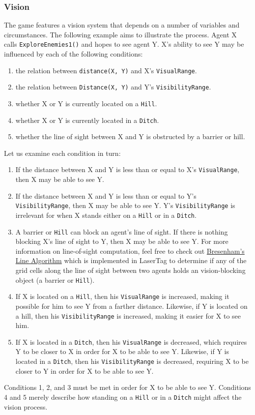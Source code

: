\documentclass[a4paper,english,DIV=16,11pt,parskip=half,dvipsnames,listof=totoc,index=totoc,bibliography=totoc]{scrartcl}
\begin{document}
\subsubsection{Vision} \label{sssec:vision}
The game features a vision system that depends on a number of variables and circumstances. The following example aims to illustrate the process. Agent X calls \texttt{ExploreEnemies1()} and hopes to see agent Y. X's ability to see Y may be influenced by each of the following conditions:
%
\begin{enumerate}
  \item the relation between \texttt{distance(X, Y)} and X's \texttt{VisualRange}.
  \item the relation between \texttt{Distance(X, Y)} and Y's \texttt{VisibilityRange}.
  \item whether X or Y is currently located on a \texttt{Hill}.
  \item whether X or Y is currently located in a \texttt{Ditch}.
  \item whether the line of sight between X and Y is obstructed by a barrier or hill.
\end{enumerate}
%
Let us examine each condition in turn:
%
\begin{enumerate}
  \item If the distance between X and Y is less than or equal to X's \texttt{VisualRange}, then X may be able to see Y.
  \item If the distance between X and Y is less than or equal to Y's \texttt{VisibilityRange}, then X may be able to see Y. Y's \texttt{VisibilityRange} is irrelevant for when X stands either on a \texttt{Hill} or in a \texttt{Ditch}.
  \item A barrier or \texttt{Hill} can block an agent's line of sight. If there is nothing blocking X's line of sight to Y, then X may be able to see Y. For more information on line-of-sight computation, feel free to check out \href{http://tech-algorithm.com/articles/drawing-line-using-bresenham-algorithm/}{Bresenham's Line Algorithm} which is implemented in LaserTag to determine if any of the grid cells along the line of sight between two agents holds an vision-blocking object (a barrier or \texttt{Hill}).
  \item If X is located on a \texttt{Hill}, then his \texttt{VisualRange} is increased, making it possible for him to see Y from a farther distance. Likewise, if Y is located on a hill, then his \texttt{VisibilityRange} is increased, making it easier for X to see him.
  \item If X is located in a \texttt{Ditch}, then his \texttt{VisualRange} is decreased, which requires Y to be closer to X in order for X to be able to see Y. Likewise, if Y is located in a \texttt{Ditch}, then his \texttt{VisibilityRange} is decreased, requiring X to be closer to Y in order for X to be able to see Y.
\end{enumerate}
%
Conditions 1, 2, and 3 must be met in order for X to be able to see Y. Conditions 4 and 5 merely describe how standing on a \texttt{Hill} or in a \texttt{Ditch} might affect the vision process.
%
\end{document}

